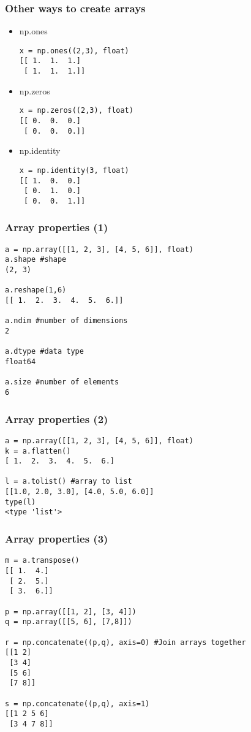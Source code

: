 \documentclass{beamer}
\begin{document}
\begin{frame}[fragile]
\frametitle{Other ways to create arrays}
\begin{itemize}
\item np.ones
\begin{lstlisting}
x = np.ones((2,3), float)
[[ 1.  1.  1.]
 [ 1.  1.  1.]]
\end{lstlisting}

\item np.zeros
\begin{lstlisting}
x = np.zeros((2,3), float)
[[ 0.  0.  0.]
 [ 0.  0.  0.]]
\end{lstlisting}

\item np.identity
\begin{lstlisting}
x = np.identity(3, float)
[[ 1.  0.  0.]
 [ 0.  1.  0.]
 [ 0.  0.  1.]]
\end{lstlisting}
\end{itemize}
\end{frame}

\begin{frame}[fragile]
\frametitle{Array properties (1)}
\begin{lstlisting}
a = np.array([[1, 2, 3], [4, 5, 6]], float)
a.shape #shape
(2, 3)

a.reshape(1,6)
[[ 1.  2.  3.  4.  5.  6.]]

a.ndim #number of dimensions
2

a.dtype #data type
float64

a.size #number of elements
6
\end{lstlisting}
\end{frame}

\begin{frame}[fragile]
\frametitle{Array properties (2)}
\begin{lstlisting}
a = np.array([[1, 2, 3], [4, 5, 6]], float)
k = a.flatten()
[ 1.  2.  3.  4.  5.  6.]

l = a.tolist() #array to list
[[1.0, 2.0, 3.0], [4.0, 5.0, 6.0]]
type(l)
<type 'list'>
\end{lstlisting}
\end{frame}

\begin{frame}[fragile]
\frametitle{Array properties (3)}
\begin{lstlisting}
m = a.transpose()
[[ 1.  4.]
 [ 2.  5.]
 [ 3.  6.]]

p = np.array([[1, 2], [3, 4]])
q = np.array([[5, 6], [7,8]])

r = np.concatenate((p,q), axis=0) #Join arrays together
[[1 2]
 [3 4]
 [5 6]
 [7 8]]

s = np.concatenate((p,q), axis=1)
[[1 2 5 6]
 [3 4 7 8]]
\end{lstlisting}
\end{frame}
\end{document}
